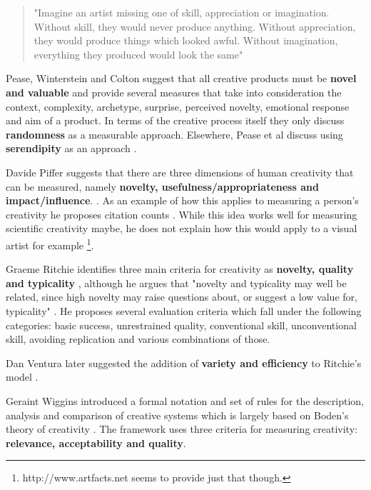 \begin{quote}
"Imagine an artist missing one of skill, appreciation or imagination. Without skill, they would never produce anything. Without appreciation, they would produce things which looked awful. Without imagination, everything they produced would look the same" \citep{Colton2008a}
\end{quote}

Pease, Winterstein and Colton suggest that all creative products must be \textbf{novel and valuable} \citep[p.1]{Pease2001} and provide several measures that take into consideration the context, complexity, archetype, surprise, perceived novelty, emotional response and aim of a product. In terms of the creative process itself they only discuss \textbf{randomness} as a measurable approach. Elsewhere, Pease et al discuss using \textbf{serendipity} as an approach \citep{Pease2013}.

Davide Piffer suggests that there are three dimensions of human creativity that can be measured, namely \textbf{novelty, usefulness/appropriateness and impact/influence}. \citep[p.258-259]{Piffer2012}. As an example of how this applies to measuring a person’s creativity he proposes citation counts \citep[p.261]{Piffer2012}. While this idea works well for measuring scientific creativity maybe, he does not explain how this would apply to a visual artist for example \footnote{http://www.artfacts.net seems to provide just that though.}.

Graeme Ritchie identifies three main criteria for creativity as \textbf{novelty, quality and typicality} \citep[p.72-73]{Ritchie2007}, although he argues that "novelty and typicality may well be related, since high novelty may raise questions about, or suggest a low value for, typicality" \citep[p.73]{Ritchie2007} \citep[see also]{Ritchie2001}. He proposes several evaluation criteria which fall under the following categories: \citep[p.91-92]{Ritchie2007} basic success, unrestrained quality, conventional skill, unconventional skill, avoiding replication and various combinations of those.

Dan Ventura later suggested the addition of \textbf{variety and efficiency} to Ritchie’s model \citep[p.7]{Ventura2008}.

Geraint Wiggins introduced a formal notation and set of rules for the description, analysis and comparison of creative systems \citep{Wiggins2006} which is largely  based on Boden’s theory of creativity \citep{Boden2003}. The framework uses three criteria for measuring creativity: \textbf{relevance, acceptability and quality}.

